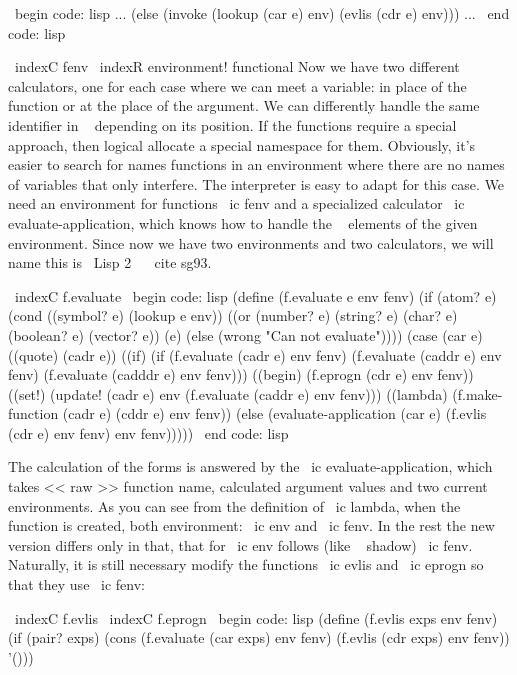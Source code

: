 {\ begin {code: lisp}
...
(else (invoke (lookup (car e) env)
              (evlis (cdr e) env))) ...
\ end {code: lisp}

\ indexC {fenv}
\ indexR {environment! functional}
Now we have two different calculators, one for each case where we can
meet a variable: in place of the function or at the place of the argument. We can
differently handle the same identifier in ~ depending on its
position. If the functions require a special approach, then logical
allocate a special namespace for them. Obviously, it's easier to search for names
functions in an environment where there are no names of variables that only interfere.
The interpreter is easy to adapt for this case. We need an environment
for functions \ ic {fenv} and a specialized calculator
\ ic {evaluate-application}, which knows how to handle the ~ elements of the given
environment. Since now we have two environments and two calculators, we will name
this is \ Lisp 2 ~ \ cite {sg93}.

\ indexC {f.evaluate}
\ begin {code: lisp}
(define (f.evaluate e env fenv)
  (if (atom? e)
      (cond ((symbol? e) (lookup e env))
            ((or (number? e) (string? e) (char? e)
                 (boolean? e) (vector? e))
             (e)
            (else (wrong "Can not evaluate"))))
      (case (car e)
        ((quote) (cadr e))
        ((if) (if (f.evaluate (cadr e) env fenv)
                      (f.evaluate (caddr e) env fenv)
                      (f.evaluate (cadddr e) env fenv)))
        ((begin) (f.eprogn (cdr e) env fenv))
        ((set!) (update! (cadr e)
                           env
                           (f.evaluate (caddr e) env fenv)))
        ((lambda) (f.make-function (cadr e) (cddr e) env fenv))
        (else (evaluate-application (car e)
                                        (f.evlis (cdr e) env fenv)
                                        env
                                        fenv)))))
\ end {code: lisp}

The calculation of the forms is answered by the \ ic {evaluate-application}, which takes
<< raw >> function name, calculated argument values ​​and two current environments.
As you can see from the definition of \ ic {lambda}, when the function is created, both
environment: \ ic {env} and \ ic {fenv}. In the rest the new version differs only in that,
that for \ ic {env} follows (like ~ shadow) \ ic {fenv}. Naturally, it is still necessary
modify the functions \ ic {evlis} and \ ic {eprogn} so that they use \ ic {fenv}:

\ indexC {f.evlis}
\ indexC {f.eprogn}
\ begin {code: lisp}
(define (f.evlis exps env fenv)
  (if (pair? exps)
      (cons (f.evaluate (car exps) env fenv)
            (f.evlis (cdr exps) env fenv))
      '()))

}
